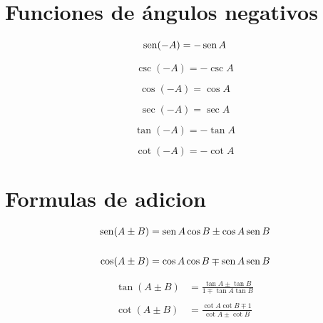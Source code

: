 \section*{Funciones de ángulos negativos}

\begin{minipage}[c]{0.3\textwidth}
$$ \operatorname{sen} (-A)=-\operatorname{sen} A$$

$$ \csc (-A)=-\csc A$$
\end{minipage}  \begin{minipage}[c]{0.3\textwidth}
$$\cos (-A)=\cos A$$

$$\sec (-A)=\sec A$$

\end{minipage}  \begin{minipage}[c]{0.3\textwidth}
$$\tan (-A)=-\tan A$$

$$\cot (-A)=-\cot A$$

\end{minipage}


\newpage

\section*{Formulas de adicion}
\begin{minipage}[c]{0.5\textwidth}
\begin{align*}
\operatorname{sen} (A \pm B) &= \operatorname{sen} A \cos B \pm \cos A \operatorname{sen} B\\\\
\cos (A \pm B) &= \cos A \cos B \mp \operatorname{sen} A \operatorname{sen} B
\end{align*}

\end{minipage} 
\begin{minipage}[c]{0.5\textwidth}
\begin{align*}
\tan (A \pm B) &= \frac{\tan A \pm \tan B}{1 \mp \tan A \tan B}\\\\
\cot (A \pm B) &= \frac{\cot A \cot B \mp 1}{\cot A \pm \cot B}
\end{align*}
\end{minipage}

